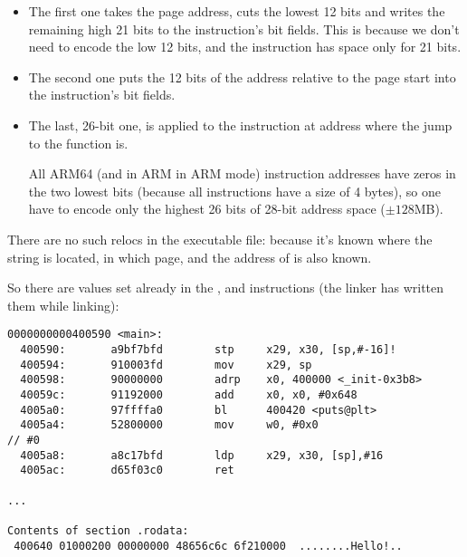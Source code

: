 \begin{itemize}
\item 
The first one takes the page address, cuts the lowest 12 bits and writes the remaining high 21 bits
to the  instruction's bit fields. This is because we don't need to encode the low 12 bits,
and the  instruction has space only for 21 bits.

\item 
The second one puts the 12 bits of the address relative to the page start into the \ADD instruction's bit fields.

\item 
The last, 26-bit one, is applied to the instruction at address  where the 
jump to the \printf function is.

All ARM64 (and in ARM in ARM mode) instruction addresses have zeros in the two lowest bits
(because all instructions have a size of 4 bytes),
so one have to encode only the highest 26 bits of 28-bit address space ($\pm 128$MB).

\end{itemize}

There are no such relocs in the executable file: because it's known where the  string
is located, in which page, and the address of \puts is also known.

So there are values set already in the , \ADD and  instructions
(the linker has written them while linking):

\begin{lstlisting}[caption=objdump of executable file,style=customasmARM]
0000000000400590 <main>:
  400590:       a9bf7bfd        stp     x29, x30, [sp,#-16]!
  400594:       910003fd        mov     x29, sp
  400598:       90000000        adrp    x0, 400000 <_init-0x3b8>
  40059c:       91192000        add     x0, x0, #0x648
  4005a0:       97ffffa0        bl      400420 <puts@plt>
  4005a4:       52800000        mov     w0, #0x0                        // #0
  4005a8:       a8c17bfd        ldp     x29, x30, [sp],#16
  4005ac:       d65f03c0        ret

...

Contents of section .rodata:
 400640 01000200 00000000 48656c6c 6f210000  ........Hello!..
\end{lstlisting}


